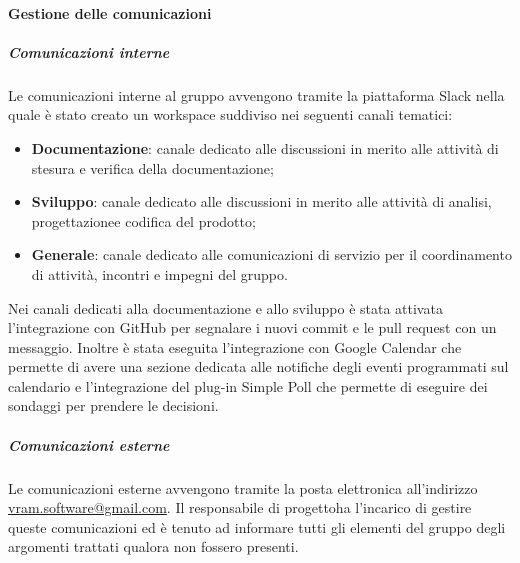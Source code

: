 			\paragraph{Gestione delle comunicazioni}
				\subparagraph*{Comunicazioni interne}
					Le comunicazioni interne al gruppo avvengono tramite la piattaforma Slack nella quale è stato creato un workspace suddiviso nei seguenti canali tematici:
					\begin{itemize}
						\item \textbf{Documentazione}: canale dedicato alle discussioni in merito alle attività di stesura e verifica della documentazione;
						\item \textbf{Sviluppo}: canale dedicato alle discussioni in merito alle attività di analisi, progettazione\glosp e codifica del prodotto\glo;
						\item \textbf{Generale}: canale dedicato alle comunicazioni di servizio per il coordinamento di attività, incontri e impegni del gruppo.
					\end{itemize}
					Nei canali dedicati alla documentazione e allo sviluppo è stata attivata l'integrazione con GitHub per segnalare i nuovi commit e le pull request con un messaggio.
					Inoltre è stata eseguita l'integrazione con Google Calendar che permette di avere una sezione dedicata alle notifiche degli eventi programmati sul calendario e l'integrazione del plug-in Simple Poll che permette di eseguire dei sondaggi per prendere le decisioni.
				\subparagraph*{Comunicazioni esterne}
					Le comunicazioni esterne avvengono tramite la posta elettronica all'indirizzo \url{vram.software@gmail.com}.
					Il responsabile di progetto\glosp ha l'incarico di gestire queste comunicazioni ed è tenuto ad informare tutti gli elementi del gruppo degli argomenti trattati qualora non fossero presenti.
